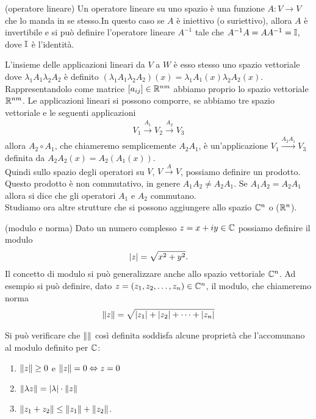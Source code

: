 \begin{definition}{(operatore lineare)} 
Un operatore lineare su uno spazio è una funzione $A : V \rightarrow V$ che lo manda in se stesso.In questo caso se $A$ è iniettivo (o suriettivo), allora $A$ è invertibile e si può definire l'operatore lineare $A^{-1}$ tale che $A^{-1} A = A A^{-1} = \mathbb{I}$, dove $\mathbb{I}$ è l'identità.
\end{definition} 

L'insieme delle applicazioni lineari da $V$ a $W$ è esso stesso uno spazio vettoriale dove $\lambda_1 A_1 \lambda_2 A_2$ è definito $\left(\lambda_1 A_1 \lambda_2 A_2 \right) (x) = \lambda_1 A_1(x) \lambda_2 A_2(x)$. Rappresentandolo come matrice $\left[a_{ij}\right] \in \mathbb R^{nm}$ abbiamo proprio lo spazio vettoriale $\mathbb R^{nm}$. Le applicazioni lineari si possono comporre, se abbiamo tre spazio vettoriale e le seguenti applicazioni 
\begin{align*}
V_1 \xrightarrow{A_1} V_2 \xrightarrow{A_2} V_3
\end{align*} 
allora $A_2 \circ A_1$, che chiameremo semplicemente $A_2 A_1$, è un'applicazione $V_1 \xrightarrow{A_2 A_1} V_3$ definita da $A_2 A_2 (x) = A_2 \left(A_1(x)\right)$.\\
Quindi sullo spazio degli operatori su $V$, $V \xrightarrow{A} V$, possiamo definire un prodotto. Questo prodotto è non commutativo, in genere $A_1A_2 \neq A_2A_1$. Se $A_1A_2 = A_2A_1$ allora si dice che gli operatori $A_1$ e $A_2$ commutano.\\

Studiamo ora altre strutture che si possono aggiungere allo spazio $\mathbb C^n$ o ($\mathbb R^n$).

\begin{definition}{(modulo e norma)} 
Dato un numero complesso $z = x + iy \in \mathbb C$ possiamo definire il modulo 
\begin{align*}
{\left|z\right|} = \sqrt{x^2 + y^2}.
\end{align*} 
Il concetto di modulo si può generalizzare anche allo spazio vettoriale $\mathbb C^n$. Ad esempio si può definire, dato $z = (z_1, z_2, \ldots, z_n) \in \mathbb C^n$, il modulo, che chiameremo norma
\begin{align*}
{\|z\|} = \sqrt{{\left|z_1\right|} + {\left|z_2\right|} + \cdots + {\left|z_n\right|}}
\end{align*}
\end{definition}

Si può verificare che ${\| \|}$ così definita soddisfa alcune proprietà che l'accomunano al modulo definito per $\mathbb C$:
\begin{enumerate}
\item ${\|z\|} \geq 0$		e ${\|z\|} = 0 \Leftrightarrow z=0$
\item ${\|\lambda z\|} = {\left|\lambda\right|}\cdot {\|z\|}$
\item ${\|z_1 + z_2\|} \leq {\|z_1\|} + {\|z_2\|}$.
\end{enumerate} 